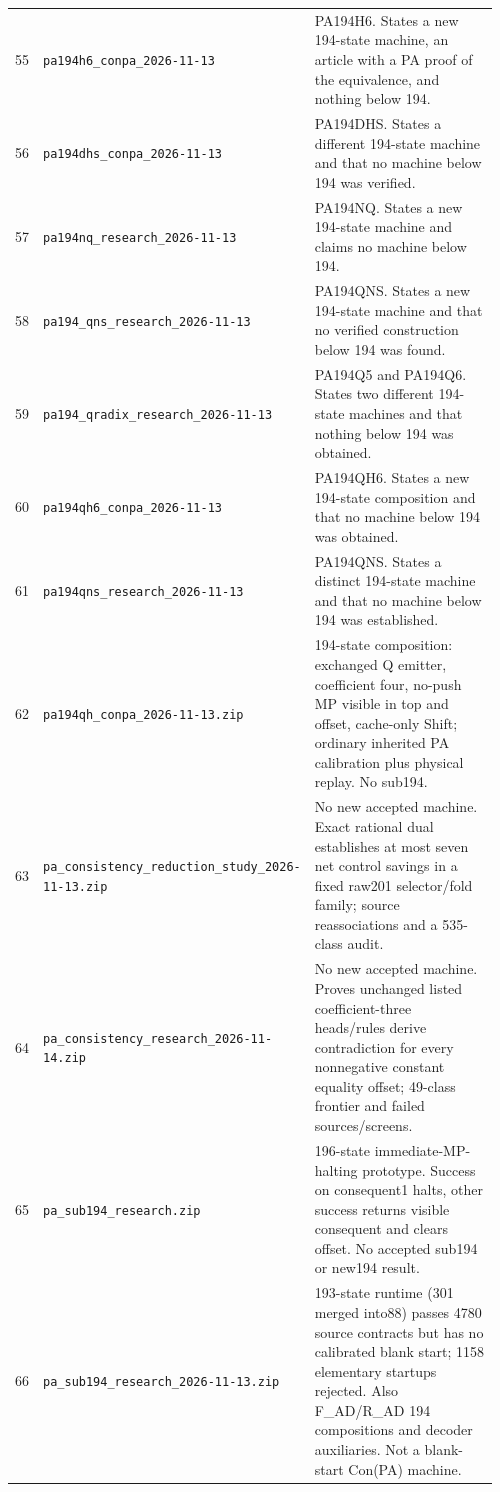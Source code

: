 \begin{longtable}{@{}p{0.035\linewidth}p{0.325\linewidth}p{0.60\linewidth}@{}}
55 & \nolinkurl{pa194h6_conpa_2026-11-13} & PA194H6. States a new 194-state machine, an article with a PA proof of the equivalence, and nothing below 194.\\[5pt]
56 & \nolinkurl{pa194dhs_conpa_2026-11-13} & PA194DHS. States a different 194-state machine and that no machine below 194 was verified.\\[5pt]
57 & \nolinkurl{pa194nq_research_2026-11-13} & PA194NQ. States a new 194-state machine and claims no machine below 194.\\[5pt]
58 & \nolinkurl{pa194_qns_research_2026-11-13} & PA194QNS. States a new 194-state machine and that no verified construction below 194 was found.\\[5pt]
59 & \nolinkurl{pa194_qradix_research_2026-11-13} & PA194Q5 and PA194Q6. States two different 194-state machines and that nothing below 194 was obtained.\\[5pt]
60 & \nolinkurl{pa194qh6_conpa_2026-11-13} & PA194QH6. States a new 194-state composition and that no machine below 194 was obtained.\\[5pt]
61 & \nolinkurl{pa194qns_research_2026-11-13} & PA194QNS. States a distinct 194-state machine and that no machine below 194 was established.\\[5pt]
62 & \nolinkurl{pa194qh_conpa_2026-11-13.zip} & 194-state composition: exchanged Q emitter, coefficient four, no-push MP visible in top and offset, cache-only Shift; ordinary inherited PA calibration plus physical replay. No sub194.\\[5pt]
63 & \nolinkurl{pa_consistency_reduction_study_2026-11-13.zip} & No new accepted machine. Exact rational dual establishes at most seven net control savings in a fixed raw201 selector/fold family; source reassociations and a 535-class audit.\\[5pt]
64 & \nolinkurl{pa_consistency_research_2026-11-14.zip} & No new accepted machine. Proves unchanged listed coefficient-three heads/rules derive contradiction for every nonnegative constant equality offset; 49-class frontier and failed sources/screens.\\[5pt]
65 & \nolinkurl{pa_sub194_research.zip} & 196-state immediate-MP-halting prototype. Success on consequent1 halts, other success returns visible consequent and clears offset. No accepted sub194 or new194 result.\\[5pt]
66 & \nolinkurl{pa_sub194_research_2026-11-13.zip} & 193-state runtime (301 merged into88) passes 4780 source contracts but has no calibrated blank start; 1158 elementary startups rejected. Also F\_\allowbreak{}AD/R\_\allowbreak{}AD 194 compositions and decoder auxiliaries. Not a blank-start Con(PA) machine.\\[5pt]

\end{longtable}
